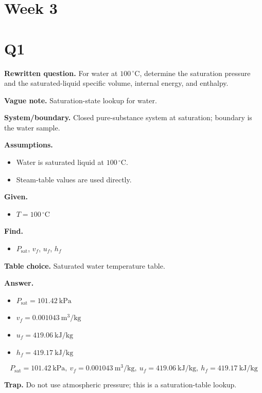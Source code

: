\section*{Week 3}

\section*{Q1}
\textbf{Rewritten question.} For water at $100\,^{\circ}\mathrm{C}$, determine the saturation pressure and the saturated-liquid specific volume, internal energy, and enthalpy.

\textbf{Vague note.} Saturation-state lookup for water.

\textbf{System/boundary.} Closed pure-substance system at saturation; boundary is the water sample.

\textbf{Assumptions.}
\begin{itemize}
  \item Water is saturated liquid at $100\,^{\circ}\mathrm{C}$.
  \item Steam-table values are used directly.
\end{itemize}

\textbf{Given.}
\begin{itemize}
  \item $T = 100\,^{\circ}\mathrm{C}$
\end{itemize}

\textbf{Find.}
\begin{itemize}
  \item $P_{\mathrm{sat}}$, $v_f$, $u_f$, $h_f$
\end{itemize}

\textbf{Table choice.} Saturated water temperature table.

\textbf{Answer.}
\begin{itemize}
  \item $P_{\mathrm{sat}} = 101.42\ \mathrm{kPa}$
  \item $v_f = 0.001043\ \mathrm{m^3/kg}$
  \item $u_f = 419.06\ \mathrm{kJ/kg}$
  \item $h_f = 419.17\ \mathrm{kJ/kg}$
\end{itemize}

\[\boxed{P_{\mathrm{sat}} = 101.42\ \mathrm{kPa},\ v_f = 0.001043\ \mathrm{m^3/kg},\ u_f = 419.06\ \mathrm{kJ/kg},\ h_f = 419.17\ \mathrm{kJ/kg}}\]

\textbf{Trap.} Do not use atmospheric pressure; this is a saturation-table lookup.

